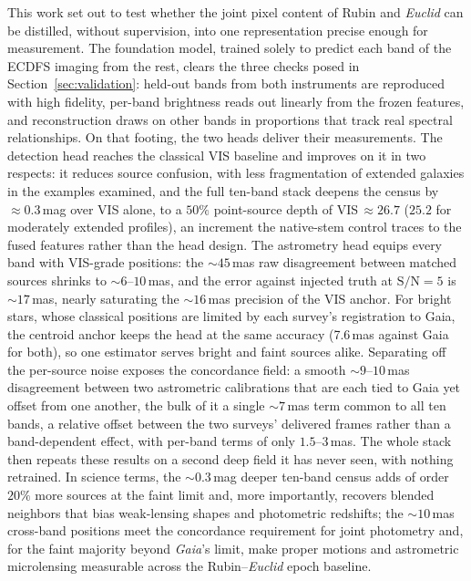 \documentclass[twocolumn,linenumbers]{aastex701}
\begin{document}
This work set out to test whether the joint pixel content of Rubin and \textit{Euclid} can be distilled, without supervision, into one representation precise enough for measurement. The foundation model, trained solely to predict each band of the ECDFS imaging from the rest, clears the three checks posed in Section~\ref{sec:validation}: held-out bands from both instruments are reproduced with high fidelity, per-band brightness reads out linearly from the frozen features, and reconstruction draws on other bands in proportions that track real spectral relationships. On that footing, the two heads deliver their measurements. The detection head reaches the classical VIS baseline and improves on it in two respects: it reduces source confusion, with less fragmentation of extended galaxies in the examples examined, and the full ten-band stack deepens the census by ${\approx}0.3$\,mag over VIS alone, to a $50\%$ point-source depth of VIS\,${\approx}26.7$ ($25.2$ for moderately extended profiles), an increment the native-stem control traces to the fused features rather than the head design. The astrometry head equips every band with VIS-grade positions: the ${\sim}45$\,mas raw disagreement between matched sources shrinks to ${\sim}6$--$10$\,mas, and the error against injected truth at $\mathrm{S/N}=5$ is ${\sim}17$\,mas, nearly saturating the ${\sim}16$\,mas precision of the VIS anchor. For bright stars, whose classical positions are limited by each survey's registration to Gaia, the centroid anchor keeps the head at the same accuracy (7.6\,mas against Gaia for both), so one estimator serves bright and faint sources alike. Separating off the per-source noise exposes the concordance field: a smooth ${\sim}9$--$10$\,mas disagreement between two astrometric calibrations that are each tied to Gaia yet offset from one another, the bulk of it a single ${\sim}7$\,mas term common to all ten bands, a relative offset between the two surveys' delivered frames rather than a band-dependent effect, with per-band terms of only $1.5$--$3$\,mas. The whole stack then repeats these results on a second deep field it has never seen, with nothing retrained. In science terms, the ${\sim}0.3$\,mag deeper ten-band census adds of order $20\%$ more sources at the faint limit and, more importantly, recovers blended neighbors that bias weak-lensing shapes and photometric redshifts; the ${\sim}10$\,mas cross-band positions meet the concordance requirement for joint photometry \citep{Chary2020} and, for the faint majority beyond \textit{Gaia}'s limit, make proper motions and astrometric microlensing measurable across the Rubin--\textit{Euclid} epoch baseline.
\end{document}
